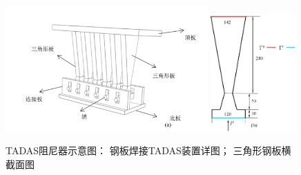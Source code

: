 \begin{figure}[H]
    \centering
    \begin{subcaptiongroup}
            \includegraphics[width=0.69\textwidth]{figure/DAMPER/TADAS/2.png}
            \label{TADAS2}
            \includegraphics[width=0.29\textwidth]{figure/DAMPER/TADAS/3.png}
            \label{TADAS3}
            \end{subcaptiongroup}
        \caption{TADAS阻尼器示意图\cite{mohammadi2017}： 钢板焊接TADAS装置详图； 三角形钢板横截面图}
    \label{TADAS2}
\end{figure}
